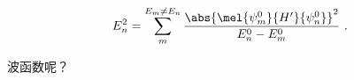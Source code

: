 
\begin{issues}
\issueDraft
\end{issues}

\begin{equation}
E_n^2 = \sum_{m}^{E_m\ne E_n} \frac{\abs{\mel{\psi_m^0}{H'}{\psi_n^0}}^2}{E_n^0-E_m^0}~.
\end{equation}

波函数呢？


